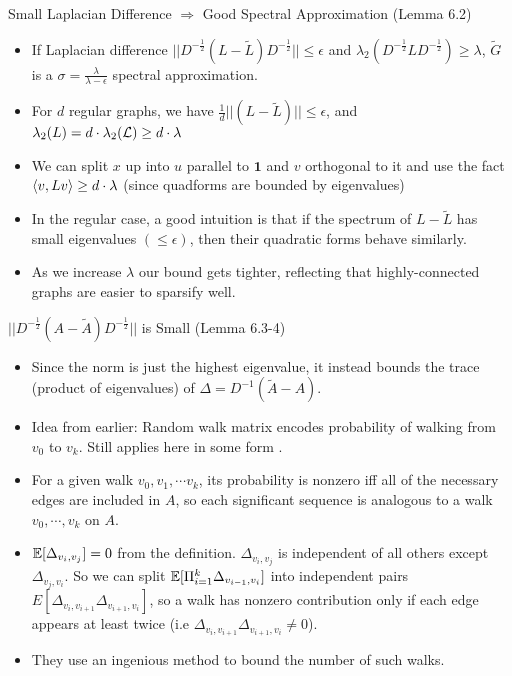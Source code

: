 \documentclass[presentation]{beamer}
\begin{document}
\begin{frame}[label={sec:org35dfe09}]{Small Laplacian Difference \(\Rightarrow\) Good Spectral Approximation (Lemma 6.2)}
\begin{itemize}
\item If Laplacian difference \(||D^{-\frac12}(L-\tilde{L}) D^{-\frac12}|| \le \epsilon\) and \(\lambda_2(D^{-\frac12}L D^{-\frac12}) \ge \lambda\), \(\tilde{G}\) is a \(\sigma = \frac{\lambda}{\lambda-\epsilon}\) spectral approximation.
\item For \(d\) regular graphs, we have \(\frac{1}{d}||(L-\tilde{L})|| \le \epsilon\), and \(\lambda_2(L)=d \cdot \lambda_2(\mathcal{L}) \ge d \cdot \lambda\)
\item We can split \(x\) up into \(u\) parallel to \(\textbf{1}\) and \(v\) orthogonal to it and use the fact \(\langle v , Lv \rangle \ge d \cdot \lambda\) (since quadforms are bounded by eigenvalues)
\item In the regular case, a good intuition is that if the spectrum of \(L-\tilde{L}\) has small eigenvalues \((\le \epsilon)\), then their quadratic forms behave similarly.
\item As we increase \(\lambda\) our bound gets tighter, reflecting that highly-connected graphs are easier to sparsify well.
\end{itemize}
\end{frame}
\begin{frame}[label={sec:orgd057683}]{\(||D^{-\frac12}(A-\tilde{A}) D^{-\frac12}||\) is Small (Lemma 6.3-4)}
\begin{itemize}
\item Since the norm is just the highest eigenvalue, it instead bounds the trace (product of eigenvalues) of \(\Delta= D^{-1}(\tilde{A}-A)\).
\item Idea from earlier: Random walk matrix encodes probability of walking from \(v_0\) to \(v_k\). Still applies here in some form .
\item For a given walk \(v_0,v_1,\cdots v_k\), its probability is nonzero iff all of the necessary edges are included in \(A\), so each significant sequence is analogous to a walk \(v_0, \cdots, v_k\) on \(A\).
\item \(\mathbb{E}[\Delta_{v_i,v_j}]=0\) from the definition. \(\Delta_{v_i,v_j}\) is independent of all others except \(\Delta_{v_j,v_i}\). So we can split \(\mathbb{E}[\Pi_{i=1}^k \Delta_{v_{i-1},v_i}]\) into independent pairs \(E[\Delta_{v_i,v_{i+1}}\Delta_{v_{i+1},v_i}]\), so a walk has nonzero contribution only if each edge appears at least twice (i.e \(\Delta_{v_i,v_{i+1}}\Delta_{v_{i+1},v_i} \ne 0\)).
\item They use an ingenious method to bound the number of such walks.
\end{itemize}
\end{frame}
\end{document}
